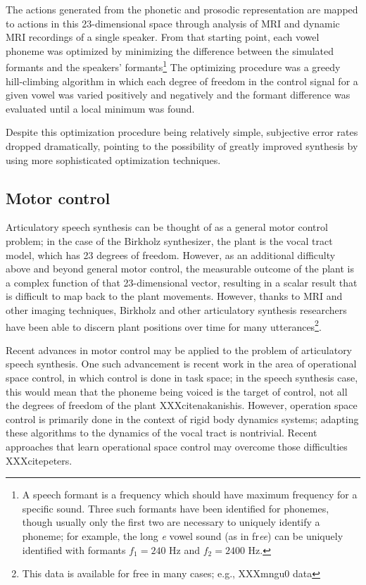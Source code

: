 \documentclass{article}
\begin{document}
The actions generated from
the phonetic and prosodic representation
are mapped to actions in this 23-dimensional space
through analysis of MRI and dynamic MRI recordings
of a single speaker.
From that starting point,
each vowel phoneme was optimized
by minimizing the difference
between the simulated formants
and the speakers' formants\footnote{A
speech formant is a frequency which should
have maximum frequency for a specific
sound. Three such formants have been identified
for phonemes, though usually only the first
two are necessary to uniquely identify
a phoneme; for example, the long \textit{e}
vowel sound (as in fr\textit{ee})
can be uniquely identified with
formants $f_1=240$ Hz and $f_2=2400$ Hz.}
The optimizing procedure
was a greedy hill-climbing algorithm
in which each degree of freedom in
the control signal for a given vowel
was varied positively and negatively
and the formant difference was evaluated
until a local minimum was found.

Despite this optimization procedure
being relatively simple,
subjective error rates dropped dramatically,
pointing to the possibility
of greatly improved synthesis
by using more sophisticated optimization techniques.

\subsection{Motor control}

Articulatory speech synthesis
can be thought of as a
general motor control problem;
in the case of the Birkholz synthesizer,
the plant is the vocal tract model,
which has 23 degrees of freedom.
However, as an additional difficulty
above and beyond general motor control,
the measurable outcome of the plant
is a complex function of that
23-dimensional vector,
resulting in a scalar result
that is difficult to map
back to the plant movements.
However, thanks to MRI and other
imaging techniques,
Birkholz and other articulatory
synthesis researchers have
been able to discern
plant positions over time
for many utterances\footnote{This
data is available for free in many cases;
e.g., XXXmngu0 data}.

Recent advances in motor control
may be applied to the problem
of articulatory speech synthesis.
One such advancement is recent work
in the area of operational space control,
in which control is done in task space;
in the speech synthesis case,
this would mean that the phoneme being voiced
is the target of control,
not all the degrees of freedom of the plant
XXXcitenakanishis.
However, operation space control
is primarily done in the context
of rigid body dynamics systems;
adapting these algorithms
to the dynamics of the vocal tract
is nontrivial.
Recent approaches that learn
operational space control
may overcome those difficulties
XXXcitepeters.
\end{document}
